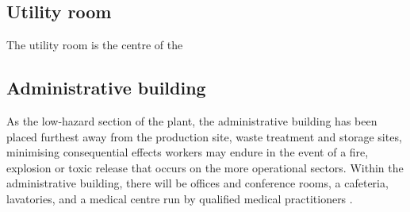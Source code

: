 \subsection{Utility room}

The utility room is the centre of the 

\subsection{Administrative building}

As the low-hazard section of the plant, the administrative building has been placed furthest away from the production site, waste treatment and storage sites, minimising  consequential effects workers may endure in the event of a fire, explosion or toxic release that occurs on the more operational sectors. Within the administrative building, there will be offices and conference rooms, a cafeteria, lavatories, and a medical centre run by qualified medical practitioners \cite{sinnott_coulson_2005}. 